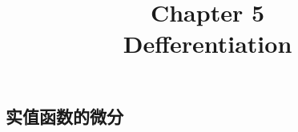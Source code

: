 \documentclass{article}
\title{\Huge \textbf{Chapter 5}\\
Defferentiation}
\begin{document}
\maketitle

\begin{center}
   \section*{实值函数的微分} 
\end{center}
\end{document}
